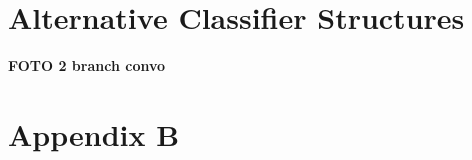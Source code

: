 \chapter{Alternative Classifier Structures} 
\label{app:2bmodel}
\textbf{\large FOTO 2 branch convo}

\chapter{Appendix B}
\label{app:lb_bonus_res}

